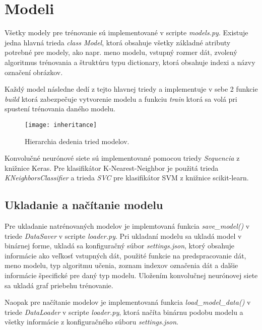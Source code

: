 
\section{Modeli}
\label{sec:modely}
Všetky modely pre trénovanie sú implementované v scripte \textit{models.py}.
Existuje jedna hlavná trieda \textit{class Model}, ktorá obsahuje všetky základné atributy potrebné pre modely, ako napr.
    meno modelu, vstupný rozmer dát, zvolený algoritmus trénovania a štruktúru typu dictionary, ktorá obsahuje indexi a názvy označení obrázkov.

Každý model následne dedí z tejto hlavnej triedy a implementuje v sebe 2 funkcie \textit{build} ktorá zabezpečuje vytvorenie modelu a
    funkciu \textit{train} ktorá sa volá pri spustení trénovania daného modelu.

\begin{figure}[H]
    \centering
    \texttt{[image: inheritance]}
    \caption{Hierarchia dedenia tried modelov.}
    \label{pic:inheritance}
\end{figure}

Konvolučné neurónové siete sú implementované pomocou triedy \textit{Sequencia} z knižnice Keras.
Pre klasifikátor K-Nearest-Neighbor je použitá trieda \textit{KNeighborsClassifier} a trieda \textit{SVC} pre klasifikátor SVM z knižnice scikit-learn.

\subsection{Ukladanie a načítanie modelu}
\label{subsec:ukladaniemodelu}
Pre ukladanie natrénovaných modelov je implemtovaná funkcia \textit{save\_model()} v triede \textit{DataSaver} v scripte \textit{loader.py}.
Pri ukladaní modelu sa ukladá model v binárnej forme, ukladá sa konfiguračný súbor \textit{settings.json}, ktorý obsahuje informácie ako veľkosť
    vstupných dát, použité funkcie na predspracovanie dát, meno modelu, typ algoritmu učenia, zoznam indexov označenia dát a dalšie informácie
    špecifické pre daný typ modelu.
Uložením konvolučnej neurónovej siete sa ukladá graf priebehu trénovanie.

Naopak pre načítanie modelov je implementovaná funkcia \textit{load\_model\_data()} v triede \textit{DataLoader} v scripte \textit{loader.py},
    ktorá načíta binárnu podobu modelu a všetky informácie z konfiguračného súboru \textit{settings.json}.
